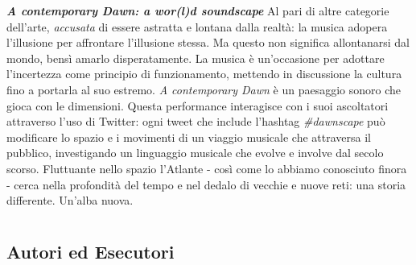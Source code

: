 \documentclass[8pt, twoside, a5paper]{extreport}
\newcommand{\descrizione}[2]{%
\noindent \textbf{\textit{#1}} %
#2 %
\\
}%
\begin{document}
\begin{multicols}{2}
\descrizione{A contemporary Dawn: a wor(l)d soundscape}{Al pari di altre categorie dell'arte, \textit{accusata} di essere astratta e lontana dalla realtà: la musica adopera l'illusione per affrontare l'illusione stessa. Ma questo non significa allontanarsi dal mondo, bensì amarlo disperatamente. La musica è un'occasione per adottare l'incertezza come principio di funzionamento, mettendo in discussione la cultura fino a portarla al suo estremo.
\textit{A contemporary Dawn} è un paesaggio sonoro che gioca con le dimensioni. Questa performance interagisce con i suoi ascoltatori attraverso l’uso di Twitter: ogni tweet che include l’hashtag \textit{\#dawnscape} può modificare lo spazio e i movimenti di un viaggio musicale che attraversa il pubblico, investigando un linguaggio musicale che evolve e involve dal secolo scorso.
Fluttuante nello spazio l'Atlante - così come lo abbiamo conosciuto finora - cerca nella profondità del tempo e nel dedalo di vecchie e nuove reti: una storia differente. Un’alba nuova.}

\end{multicols}

\clearpage



\section*{ }

\subsection*{\textsf{Autori ed Esecutori}\\}

{\fontsize{30}{30} }

\bigskip
\end{document}
